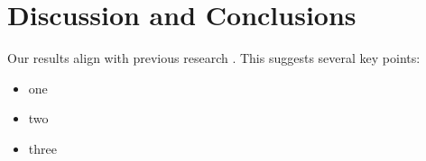 \documentclass[stu,12pt,floatsintext]{apa7}
\begin{document}
\section{Discussion and Conclusions}

Our results align with previous research \citep{mujtaba2023frc}. This suggests several key points:

\begin{itemize}
    \item one
    \item two
    \item three
\end{itemize}


\end{document}
